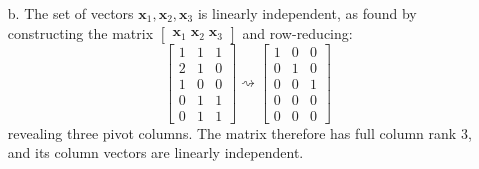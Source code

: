 \documentclass[11pt]{article}
\newcommand{\vect}[1]{\bm{#1}}      %
\theoremstyle{definition}
\theoremstyle{plain}
\theoremstyle{remark}
\begin{document}
\begin{enumerate}
\begin{enumerate}
              \item[b.] The set of vectors $\vect{x}_1, \vect{x}_2, \vect{x}_3$ is linearly independent, as found
                    by constructing the matrix $\begin{bmatrix}
                            \vect{x}_1 \; \vect{x}_2 \; \vect{x}_3
                        \end{bmatrix}$ and row-reducing:
                    \[
                        \begin{bmatrix}
                            1 & 1 & 1 \\
                            2 & 1 & 0 \\
                            1 & 0 & 0 \\
                            0 & 1 & 1 \\
                            0 & 1 & 1
                        \end{bmatrix}
                        \rightsquigarrow
                        \begin{bmatrix}
                            1 & 0 & 0 \\
                            0 & 1 & 0 \\
                            0 & 0 & 1 \\
                            0 & 0 & 0 \\
                            0 & 0 & 0
                        \end{bmatrix}
                    \]
                    revealing three pivot columns. The matrix therefore has full column rank $3$, and its column
                    vectors are linearly independent.

          \end{enumerate}


\end{enumerate}
\end{document}
